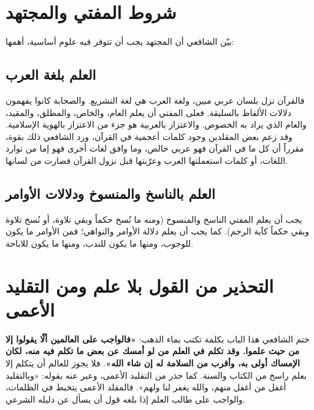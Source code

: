 \section{شروط المفتي والمجتهد}
بيّن الشافعي أن المجتهد يجب أن تتوفر فيه علوم أساسية، أهمها:

\subsection{العلم بلغة العرب}
فالقرآن نزل بلسان عربي مبين، ولغة العرب هي لغة التشريع. والصحابة كانوا يفهمون دلالات الألفاظ بالسليقة. فعلى المفتي أن يعلم العام، والخاص، والمطلق، والمقيد، والعام الذي يراد به الخصوص. والاعتزاز بالعربية هو جزء من الاعتزاز بالهوية الإسلامية. وقد زعم بعض المقلدين وجود كلمات أعجمية في القرآن، ورد الشافعي ذلك بقوة، مقرراً أن كل ما في القرآن فهو عربي خالص، وما وافق لغات أخرى فهو إما من توارد اللغات، أو كلمات استعملتها العرب وعرّبتها قبل نزول القرآن فصارت من لسانها.

\subsection{العلم بالناسخ والمنسوخ ودلالات الأوامر}
يجب أن يعلم المفتي الناسخ والمنسوخ (ومنه ما نُسخ حكماً وبقي تلاوة، أو نُسخ تلاوة وبقي حكماً كآية الرجم). كما يجب أن يعلم دلالة الأوامر والنواهي؛ فمن الأوامر ما يكون للوجوب، ومنها ما يكون للندب، ومنها ما يكون للاباحة.

\section{التحذير من القول بلا علم ومن التقليد الأعمى}
ختم الشافعي هذا الباب بكلمة تكتب بماء الذهب: \textbf{«فالواجب على العالمين ألّا يقولوا إلا من حيث علموا. وقد تكلم في العلم من لو أمسك عن بعض ما تكلم فيه منه، لكان الإمساك أولى به، وأقرب من السلامة له إن شاء الله»}.
فلا يجوز للعالم أن يتكلم إلا بعلم راسخ من الكتاب والسنة. كما حذر من التقليد الأعمى، وعبر عنه بقوله: «وبالتقليد أغفل من أغفل منهم، والله يغفر لنا ولهم». فالمقلد الأعمى يتخبط في الظلمات، والواجب على طالب العلم إذا بلغه قول أن يسأل عن دليله الشرعي.